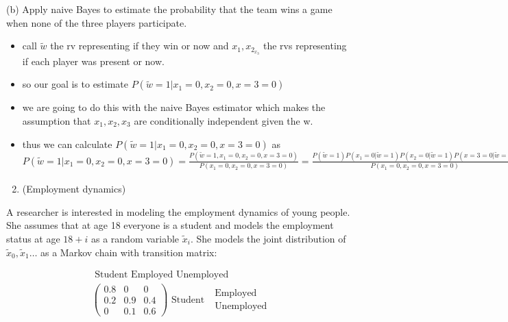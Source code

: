 \documentclass[10pt]{article}
\begin{document}
(b) Apply naive Bayes to estimate the probability that the team wins a game when none of the three players participate.
\begin{itemize}
    \item call $\tilde{w}$ the rv representing if they win or now and $x_1,x_2_x_3$ the rvs representing if each player was present or now. 
    \item so our goal is to estimate $P(\tilde{w}=1|x_1=0,x_2=0,x=3=0)$
    \item we are going to do this with the naive Bayes estimator which makes the assumption that $x_1,x_2,x_3$ are conditionally independent given the w. 
    \item thus we can calculate $P(\tilde{w}=1|x_1=0,x_2=0,x=3=0)$ as $P(\tilde{w}=1|x_1=0,x_2=0,x=3=0)=\frac{P(\tilde{w}=1,x_1=0,x_2=0,x=3=0)}{P(x_1=0,x_2=0,x=3=0)}=\frac{P(\tilde{w}=1)P(x_1=0|\tilde{w}=1)P(x_2=0|\tilde{w}=1)P(x=3=0|\tilde{w}=1)}{P(x_1=0,x_2=0,x=3=0)}=\frac{P(\tilde{w}=1)P(x_1=0|\tilde{w}=1)P(x_2=0|\tilde{w}=1)P(x=3=0|\tilde{w}=1)}{P(\tilde{w}=1)P(x_1=0|\tilde{w}=1)P(x_2=0|\tilde{w}=1)P(x=3=0|\tilde{w}=1)+P(\tilde{w}=0)P(x_1=0|\tilde{w}=0)P(x_2=0|\tilde{w}=0)P(x=3=0|\tilde{w}=0)}=\frac{\frac{1}{90}}{\frac{1}{90}+\frac{9}{160}}$ 
\end{itemize}
\begin{enumerate}
  \setcounter{enumi}{1}
  \item (Employment dynamics)
\end{enumerate}

A researcher is interested in modeling the employment dynamics of young people. She assumes that at age 18 everyone is a student and models the employment status at age $18+i$ as a random variable $\tilde{x}_{i}$. She models the joint distribution of $\tilde{x}_{0}, \tilde{x}_{1} \ldots$ as a Markov chain with transition matrix:

$$
\begin{aligned}
& \text { Student Employed Unemployed } \\
& \left(\begin{array}{ccc}0.8 & 0 & 0 \\0.2 & 0.9 & 0.4 \\0 & 0.1 & 0.6\end{array}\right) \text { Student } \begin{gathered}\text { Employed } \\\text { Unemployed }\end{gathered}
\end{aligned}
$$
\end{document}
